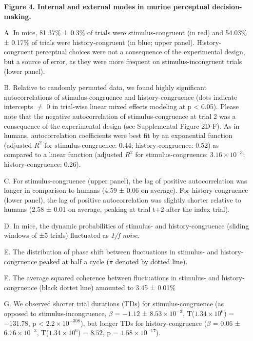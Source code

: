\documentclass[
]{article}
\begin{document}
\textbf{Figure 4. Internal and external modes in murine perceptual
decision-making.}

A. In mice, 81.37\% ± 0.3\% of trials were stimulus-congruent (in red)
and 54.03\% ± 0.17\% of trials were history-congruent (in blue; upper
panel). History-congruent perceptual choices were not a consequence of
the experimental design, but a source of error, as they were more
frequent on stimulus-incongruent trials (lower panel).

B. Relative to randomly permuted data, we found highly significant
autocorrelations of stimulus-congruence and history-congruence (dots
indicate intercepts \(\neq\) 0 in trial-wise linear mixed effects
modeling at p \textless{} 0.05). Please note that the negative
autocorrelation of stimulus-congruence at trial 2 was a consequence of
the experimental design (see Supplemental Figure 2D-F). As in humans,
autocorrelation coefficients were best fit by an exponential function
(adjusted \(R^2\) for stimulus-congruence: 0.44; history-congruence:
0.52) as compared to a linear function (adjusted \(R^2\) for
stimulus-congruence: \ensuremath{3.16\times 10^{-3}};
history-congruence: 0.26).

C. For stimulus-congruence (upper panel), the lag of positive
autocorrelation was longer in comparison to humans (4.59 ± 0.06 on
average). For history-congruence (lower panel), the lag of positive
autocorrelation was slightly shorter relative to humans (2.58 ± 0.01 on
average, peaking at trial t+2 after the index trial).

D. In mice, the dynamic probabilities of stimulus- and
history-congruence (sliding windows of ±5 trials) fluctuated as
\emph{1/f noise}.

E. The distribution of phase shift between fluctuations in stimulus- and
history-congruence peaked at half a cycle (\(\pi\) denoted by dotted
line).

F. The average squared coherence between fluctuations in stimulus- and
history-congruence (black dottet line) amounted to 3.45 ± 0.01\%

G. We observed shorter trial durations (TDs) for stimulus-congruence (as
opposed to stimulus-incongruence, \(\beta\) = \(-1.12\) ±
\(\ensuremath{8.53\times 10^{-3}}\),
T(\(\ensuremath{1.34\times 10^{6}}\)) = \(-131.78\), p < \(\ensuremath{2.2\times 10^{-308}}\)), but
longer TDs for history-congruence (\(\beta\) = \(0.06\) ±
\(\ensuremath{6.76\times 10^{-3}}\),
T(\(\ensuremath{1.34\times 10^{6}}\)) = \(8.52\), p =
\(\ensuremath{1.58\times 10^{-17}}\)).
\end{document}
